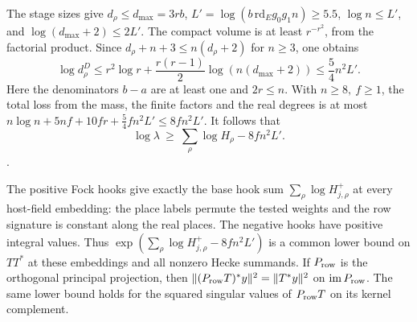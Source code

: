 The stage sizes give \(d_\rho\le d_{\max}=3rb\),
\(L'=\log(b\,\mathrm{rd}_E g_0g_1 n)\ge5.5\),
\(\log n\le L'\), and \(\log(d_{\max}+2)\le2L'\).
The compact volume is at least \(r^{-r^2}\), from the
factorial product. Since \(d_\rho+n+3\le n(d_\rho+2)\)
for \(n\ge3\), one obtains
\[
 \log d_\rho^D\le r^2\log r+
         \frac{r(r-1)}2\log(n(d_{\max}+2))
       \le \frac54 n^2L' .
\]
Here the denominators \(b-a\) are at least one and \(2r\le n\).
With \(n\ge 8,\ f\ge1\), the total loss from the mass, the
finite factors and the real degrees is at most
\(n\log n+5nf+10fr+\tfrac54 fn^2L'\le8fn^2L'\).
It follows that
\begin{equation}
\label{eq:stage-petersson-lower-bound}
 \log\lambda\ \ge\ \sum_\rho\log H_\rho-8fn^2L'.
\end{equation}
.

The positive Fock hooks give exactly the base hook sum
\(\sum_\rho\log H^+_{j,\rho}\) at every host-field embedding:
the place labels permute the tested weights and the row
signature is constant along the real places. The negative
hooks have positive integral values. Thus
\(\exp(\sum_\rho\log H^+_{j,\rho}-8fn^2L')\) is a common
lower bound on \(TT^*\) at these embeddings and all nonzero
Hecke summands. If \(P_{\rm row}\) is the orthogonal
principal projection, then
\(\|(P_{\rm row}T)^*y\|^2=\|T^*y\|^2\) on
\(\operatorname{im}P_{\rm row}\). The same lower bound holds
for the squared singular values of \(P_{\rm row}T\) on its
kernel complement.

